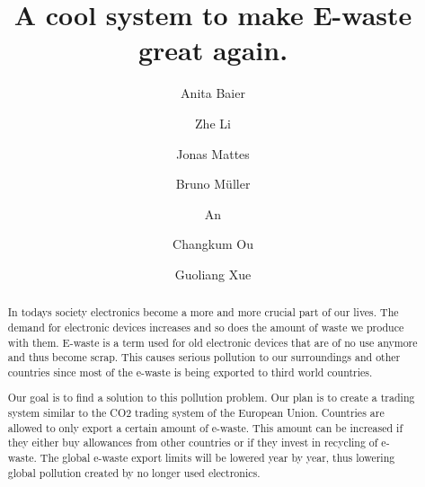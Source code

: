 \documentclass[sigchi-a, authorversion]{acmart}
\begin{document}
\title{A cool system to make E-waste great again.}

\author{Anita Baier}

\author{Zhe Li}

\author{Jonas Mattes}

\author{Bruno M\"uller}

\author{An}

\author{Changkum Ou}

\author{Guoliang Xue}


\begin{abstract}

  In todays society electronics become a more and more crucial part of our lives. 
  The demand for electronic devices increases and so does the amount of waste we produce with them. 
  E-waste is a term used for old electronic devices that are of no use anymore and thus become scrap. 
  This causes serious pollution to our surroundings and other countries since most of the e-waste is 
  being exported to third world countries.
  
  Our goal is to find a solution to this pollution problem. Our plan is to create a trading system similar 
  to the CO2 trading system of the European Union. Countries are allowed to only export a certain amount of e-waste. 
  This amount can be increased if they either buy allowances from other countries or if they invest in recycling of e-waste. 
  The global e-waste export limits will be lowered year by year, thus lowering global pollution created by no longer
  used electronics.  
  
\end{abstract}
\end{document}
